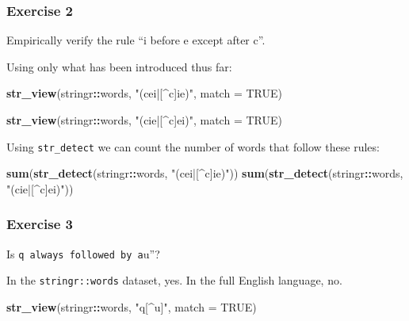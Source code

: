\documentclass[]{book}
\newenvironment{Shaded}{\begin{snugshade}}{\end{snugshade}}
\newcommand{\DataTypeTok}[1]{\textcolor[rgb]{0.13,0.29,0.53}{#1}}
\newcommand{\KeywordTok}[1]{\textcolor[rgb]{0.13,0.29,0.53}{\textbf{#1}}}
\newcommand{\NormalTok}[1]{#1}
\newcommand{\OperatorTok}[1]{\textcolor[rgb]{0.81,0.36,0.00}{\textbf{#1}}}
\newcommand{\OtherTok}[1]{\textcolor[rgb]{0.56,0.35,0.01}{#1}}
\newcommand{\StringTok}[1]{\textcolor[rgb]{0.31,0.60,0.02}{#1}}
\theoremstyle{plain}
\theoremstyle{remark}
\theoremstyle{definition}
\theoremstyle{definition}
\theoremstyle{definition}
\theoremstyle{remark}
\begin{document}
\hypertarget{exercise-2-32}{%
\subsubsection{Exercise 2}\label{exercise-2-32}}

Empirically verify the rule ``i before e except after c''.

Using only what has been introduced thus far:

\begin{Shaded}
\begin{Highlighting}[]
\KeywordTok{str_view}\NormalTok{(stringr}\OperatorTok{::}\NormalTok{words, }\StringTok{"(cei|[^c]ie)"}\NormalTok{, }\DataTypeTok{match =} \OtherTok{TRUE}\NormalTok{)}
\end{Highlighting}
\end{Shaded}

\begin{Shaded}
\begin{Highlighting}[]
\KeywordTok{str_view}\NormalTok{(stringr}\OperatorTok{::}\NormalTok{words, }\StringTok{"(cie|[^c]ei)"}\NormalTok{, }\DataTypeTok{match =} \OtherTok{TRUE}\NormalTok{)}
\end{Highlighting}
\end{Shaded}

Using \texttt{str\_detect} we can count the number of words that follow
these rules:

\begin{Shaded}
\begin{Highlighting}[]
\KeywordTok{sum}\NormalTok{(}\KeywordTok{str_detect}\NormalTok{(stringr}\OperatorTok{::}\NormalTok{words, }\StringTok{"(cei|[^c]ie)"}\NormalTok{))}
\KeywordTok{sum}\NormalTok{(}\KeywordTok{str_detect}\NormalTok{(stringr}\OperatorTok{::}\NormalTok{words, }\StringTok{"(cie|[^c]ei)"}\NormalTok{))}
\end{Highlighting}
\end{Shaded}

\hypertarget{exercise-3-29}{%
\subsubsection{Exercise 3}\label{exercise-3-29}}

Is
\texttt{q\textquotesingle{}\textquotesingle{}\ always\ followed\ by\ a}u''?

In the \texttt{stringr::words} dataset, yes. In the full English
language, no.

\begin{Shaded}
\begin{Highlighting}[]
\KeywordTok{str_view}\NormalTok{(stringr}\OperatorTok{::}\NormalTok{words, }\StringTok{"q[^u]"}\NormalTok{, }\DataTypeTok{match =} \OtherTok{TRUE}\NormalTok{)}
\end{Highlighting}
\end{Shaded}
\end{document}
